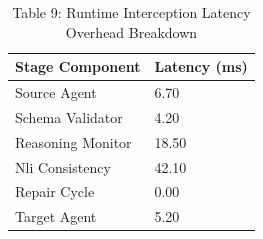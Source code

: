 \begin{table}
\caption{Table 9: Runtime Interception Latency Overhead Breakdown}
\label{tab:table9_latency_overhead}
\begin{tabular}{ll}
\toprule
Stage Component & Latency (ms) \\
\midrule
Source Agent & 6.70 \\
Schema Validator & 4.20 \\
Reasoning Monitor & 18.50 \\
Nli Consistency & 42.10 \\
Repair Cycle & 0.00 \\
Target Agent & 5.20 \\
\bottomrule
\end{tabular}
\end{table}
